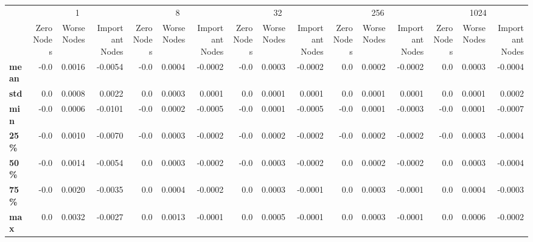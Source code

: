\begin{tabular}{lrrrrrrrrrrrrrrr}
\toprule
{} & \multicolumn{3}{c}{1} & \multicolumn{3}{c}{8} & \multicolumn{3}{c}{32} & \multicolumn{3}{c}{256} & \multicolumn{3}{c}{1024} \\
{} & Zero Nodes & Worse Nodes & Important Nodes & Zero Nodes & Worse Nodes & Important Nodes & Zero Nodes & Worse Nodes & Important Nodes & Zero Nodes & Worse Nodes & Important Nodes & Zero Nodes & Worse Nodes & Important Nodes \\
\midrule
\textbf{mean} &       -0.0 &      0.0016 &         -0.0054 &       -0.0 &      0.0004 &         -0.0002 &       -0.0 &      0.0003 &         -0.0002 &        0.0 &      0.0002 &         -0.0002 &        0.0 &      0.0003 &         -0.0004 \\
\textbf{std } &        0.0 &      0.0008 &          0.0022 &        0.0 &      0.0003 &          0.0001 &        0.0 &      0.0001 &          0.0001 &        0.0 &      0.0001 &          0.0001 &        0.0 &      0.0001 &          0.0002 \\
\textbf{min } &       -0.0 &      0.0006 &         -0.0101 &       -0.0 &      0.0002 &         -0.0005 &       -0.0 &      0.0001 &         -0.0005 &       -0.0 &      0.0001 &         -0.0003 &       -0.0 &      0.0001 &         -0.0007 \\
\textbf{25\% } &       -0.0 &      0.0010 &         -0.0070 &       -0.0 &      0.0003 &         -0.0002 &       -0.0 &      0.0002 &         -0.0002 &       -0.0 &      0.0002 &         -0.0002 &       -0.0 &      0.0003 &         -0.0004 \\
\textbf{50\% } &       -0.0 &      0.0014 &         -0.0054 &        0.0 &      0.0003 &         -0.0002 &       -0.0 &      0.0003 &         -0.0002 &        0.0 &      0.0002 &         -0.0002 &        0.0 &      0.0003 &         -0.0004 \\
\textbf{75\% } &       -0.0 &      0.0020 &         -0.0035 &        0.0 &      0.0004 &         -0.0002 &        0.0 &      0.0003 &         -0.0001 &        0.0 &      0.0003 &         -0.0001 &        0.0 &      0.0004 &         -0.0003 \\
\textbf{max } &        0.0 &      0.0032 &         -0.0027 &        0.0 &      0.0013 &         -0.0001 &        0.0 &      0.0005 &         -0.0001 &        0.0 &      0.0003 &         -0.0001 &        0.0 &      0.0006 &         -0.0002 \\
\bottomrule
\end{tabular}
